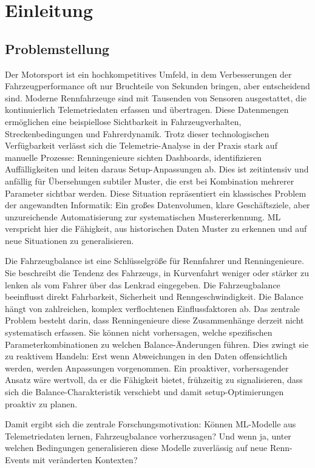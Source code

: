 \chapter{Einleitung}

\section{Problemstellung}

Der Motorsport ist ein hochkompetitives Umfeld, in dem Verbesserungen der Fahrzeugperformance oft nur Bruchteile von Sekunden bringen, aber entscheidend sind. Moderne Rennfahrzeuge sind mit Tausenden von Sensoren ausgestattet, die kontinuierlich Telemetriedaten erfassen und übertragen. Diese Datenmengen ermöglichen eine beispiellose Sichtbarkeit in Fahrzeugverhalten, Streckenbedingungen und Fahrerdynamik. Trotz dieser technologischen Verfügbarkeit verlässt sich die Telemetrie-Analyse in der Praxis stark auf manuelle Prozesse: Renningenieure sichten Dashboards, identifizieren Auffälligkeiten und leiten daraus Setup-Anpassungen ab. Dies ist zeitintensiv und anfällig für Übersehungen subtiler Muster, die erst bei Kombination mehrerer Parameter sichtbar werden.
Diese Situation repräsentiert ein klassisches Problem der angewandten Informatik: Ein großes Datenvolumen, klare Geschäftsziele, aber unzureichende Automatisierung zur systematischen Mustererkennung. \ac{ML} verspricht hier die Fähigkeit, aus historischen Daten Muster zu erkennen und auf neue Situationen zu generalisieren.

Die Fahrzeugbalance ist eine Schlüsselgröße für Rennfahrer und Renningenieure. Sie beschreibt die Tendenz des Fahrzeugs, in Kurvenfahrt weniger oder stärker zu lenken als vom Fahrer über das Lenkrad eingegeben. Die Fahrzeugbalance beeinflusst direkt Fahrbarkeit, Sicherheit und Renngeschwindigkeit. Die Balance hängt von zahlreichen, komplex verflochtenen Einflussfaktoren ab.
Das zentrale Problem besteht darin, dass Renningenieure diese Zusammenhänge derzeit nicht systematisch erfassen. Sie können nicht vorhersagen, welche spezifischen Parameterkombinationen zu welchen Balance-Änderungen führen. Dies zwingt sie zu reaktivem Handeln: Erst wenn Abweichungen in den Daten offensichtlich werden, werden Anpassungen vorgenommen. Ein proaktiver, vorhersagender Ansatz wäre wertvoll, da er die Fähigkeit bietet, frühzeitig zu signalisieren, dass sich die Balance-Charakteristik verschiebt und damit setup-Optimierungen proaktiv zu planen.

Damit ergibt sich die zentrale Forschungsmotivation: Können \ac{ML}-Modelle aus Telemetriedaten lernen, Fahrzeugbalance vorherzusagen? Und wenn ja, unter welchen Bedingungen generalisieren diese Modelle zuverlässig auf neue Renn-Events mit veränderten Kontexten?

